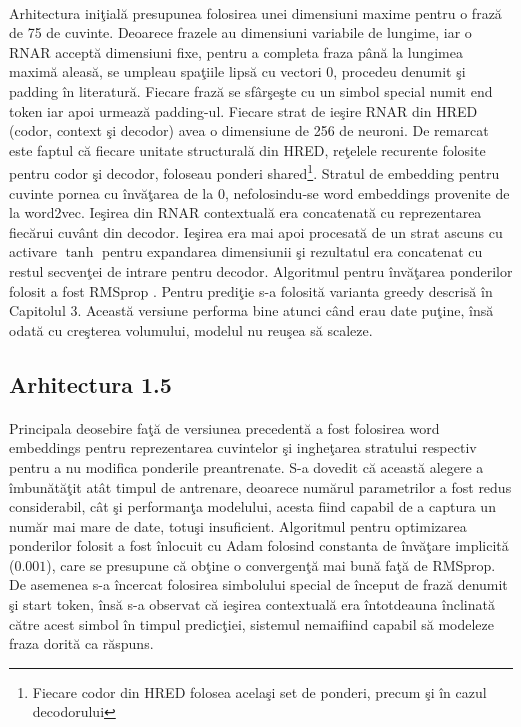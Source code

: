 \paragraph{}
Arhitectura ini\c tial\u a presupunea folosirea unei dimensiuni maxime pentru o fraz\u a de 75 de cuvinte. Deoarece frazele au dimensiuni variabile de lungime, iar o RNAR accept\u a dimensiuni fixe, pentru a completa fraza p\^ an\u a la lungimea maxim\u a aleas\u a, se umpleau spa\c tiile lips\u a cu vectori \(0\), procedeu denumit \c si padding \^ in literatur\u a. Fiecare fraz\u a se sf\^ ar\c se\c ste cu un simbol special numit end token iar apoi urmeaz\u a padding-ul.  Fiecare strat de ie\c sire RNAR din HRED (codor, context \c si decodor) avea o dimensiune de 256 de neuroni. De remarcat este faptul c\u a fiecare unitate structural\u a din HRED, re\c telele recurente folosite pentru codor \c si decodor, foloseau ponderi shared\footnote{Fiecare codor din HRED folosea acela\c si set de ponderi, precum \c si \^ in cazul decodorului}. Stratul de embedding pentru cuvinte pornea cu \^ inv\u a\c tarea de la 0, nefolosindu-se word embeddings provenite de la word2vec. Ie\c sirea din RNAR contextual\u a era concatenat\u a cu reprezentarea fiec\u arui cuv\^ ant din decodor. Ie\c sirea era mai apoi procesat\u a de un strat ascuns cu activare \(\tanh\) pentru expandarea dimensiunii \c si rezultatul era concatenat cu restul secven\c tei de intrare pentru decodor. Algoritmul pentru \^ inv\u a\c tarea ponderilor folosit a fost RMSprop \cite{rmsprop}. Pentru predi\c tie s-a folosit\u a varianta greedy descris\u a \^ in Capitolul 3. Aceast\u a versiune performa bine atunci c\^ and erau date pu\c tine, \^ ins\u a odat\u a cu cre\c sterea volumului, modelul nu reu\c sea s\u a scaleze.

\subsection{Arhitectura 1.5}

\paragraph{}
Principala deosebire fa\c t\u a de versiunea precedent\u a a fost folosirea word embeddings pentru reprezentarea cuvintelor \c si inghe\c tarea stratului respectiv pentru a nu modifica ponderile preantrenate. S-a dovedit c\u a aceast\u a alegere a \^ imbun\u at\u a\c tit at\^ at timpul de antrenare, deoarece num\u arul parametrilor a fost redus considerabil, c\^ at \c si performan\c ta modelului, acesta fiind capabil de a captura un num\u ar mai mare de date, totu\c si insuficient. Algoritmul pentru optimizarea ponderilor folosit a fost \^ inlocuit cu Adam \cite{DBLP:journals/corr/KingmaB14} folosind constanta de \^ inv\u a\c tare implicit\u a (\(0.001\)), care se presupune c\u a ob\c tine o convergen\c t\u a mai bun\u a fa\c t\u a de RMSprop. De asemenea s-a \^ incercat folosirea simbolului special de \^ inceput de fraz\u a denumit \c si start token, \^ ins\u a s-a observat c\u a ie\c sirea contextual\u a era \^ intotdeauna \^ inclinat\u a c\u atre acest simbol \^ in timpul predic\c tiei, sistemul nemaifiind capabil s\u a modeleze fraza dorit\u a ca r\u aspuns.

